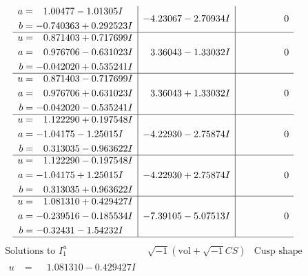 \documentclass[1p]{elsarticle_modified}
\theoremstyle{definition}
\newcommand{\I}{\sqrt{-1}}
\begin{document}
$$\begin{array}{c|c|c}
\begin{aligned}
a &= \phantom{-}1.00477 - 1.01305 I \\
b &= -0.740363 + 0.292523 I\end{aligned}
 & -4.23067 - 2.70934 I & \phantom{-0.000000 } 0 \\ \hline\begin{aligned}
u &= \phantom{-}0.871403 + 0.717699 I \\
a &= \phantom{-}0.976706 - 0.631023 I \\
b &= -0.042020 + 0.535241 I\end{aligned}
 & \phantom{-}3.36043 - 1.33032 I & \phantom{-0.000000 } 0 \\ \hline\begin{aligned}
u &= \phantom{-}0.871403 - 0.717699 I \\
a &= \phantom{-}0.976706 + 0.631023 I \\
b &= -0.042020 - 0.535241 I\end{aligned}
 & \phantom{-}3.36043 + 1.33032 I & \phantom{-0.000000 } 0 \\ \hline\begin{aligned}
u &= \phantom{-}1.122290 + 0.197548 I \\
a &= -1.04175 - 1.25015 I \\
b &= \phantom{-}0.313035 - 0.963622 I\end{aligned}
 & -4.22930 - 2.75874 I & \phantom{-0.000000 } 0 \\ \hline\begin{aligned}
u &= \phantom{-}1.122290 - 0.197548 I \\
a &= -1.04175 + 1.25015 I \\
b &= \phantom{-}0.313035 + 0.963622 I\end{aligned}
 & -4.22930 + 2.75874 I & \phantom{-0.000000 } 0 \\ \hline\begin{aligned}
u &= \phantom{-}1.081310 + 0.429427 I \\
a &= -0.239516 - 0.185534 I \\
b &= -0.32431 - 1.54232 I\end{aligned}
 & -7.39105 - 5.07513 I & \phantom{-0.000000 } 0\\
 \hline 
 \end{array}$$\newpage$$\begin{array}{c|c|c}  
\text{Solutions to }I^u_{1}& \I (\text{vol} + \sqrt{-1}CS) & \text{Cusp shape}\\
 \hline 
\begin{aligned}
u &= \phantom{-}1.081310 - 0.429427 I \\

\end{aligned}
\end{array}$$
\end{document}
